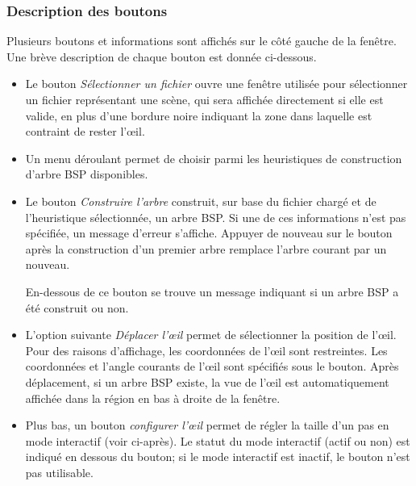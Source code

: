 \subsubsection*{Description des boutons}
Plusieurs boutons et informations sont affichés sur le côté gauche de
la fenêtre. Une brève description de chaque bouton est donnée ci-dessous.
\begin{itemize}
\item Le bouton \emph{Sélectionner un fichier} ouvre une fenêtre utilisée
  pour sélectionner un fichier représentant une scène, qui sera affichée
  directement si elle est valide, en plus d'une bordure noire indiquant
  la zone dans laquelle est contraint de rester l'\oe{}il.
\item Un menu déroulant permet
  de choisir parmi les heuristiques
  de construction d'arbre BSP disponibles.
\item Le bouton \emph{Construire l'arbre} construit, sur base du fichier
  chargé et de l'heuristique sélectionnée, un arbre BSP.
  Si une de ces informations n'est pas spécifiée, un message d'erreur s'affiche.
  Appuyer de nouveau sur le bouton après la construction d'un premier arbre
  remplace l'arbre courant par un nouveau.

  En-dessous de ce bouton se trouve un message indiquant si  un arbre BSP a été
  construit ou non.
\item L'option suivante \emph{Déplacer l'\oe{}il} permet de sélectionner
  la position de l'\oe{}il. Pour des raisons d'affichage, les coordonnées de
  l'\oe{}il sont restreintes. Les coordonnées et l'angle courants de
  l'\oe{}il sont spécifiés sous le bouton. Après déplacement, si un arbre
  BSP existe, la vue de l'\oe{}il est automatiquement affichée dans la région
  en bas à droite de la fenêtre.
\item Plus bas, un bouton \emph{configurer l'\oe{}il} permet de régler la
  taille d'un pas en mode interactif (voir ci-après). Le statut du mode
  interactif (actif ou non) est indiqué en dessous du bouton; si
  le mode interactif est inactif, le bouton n'est pas utilisable.
\end{itemize}
